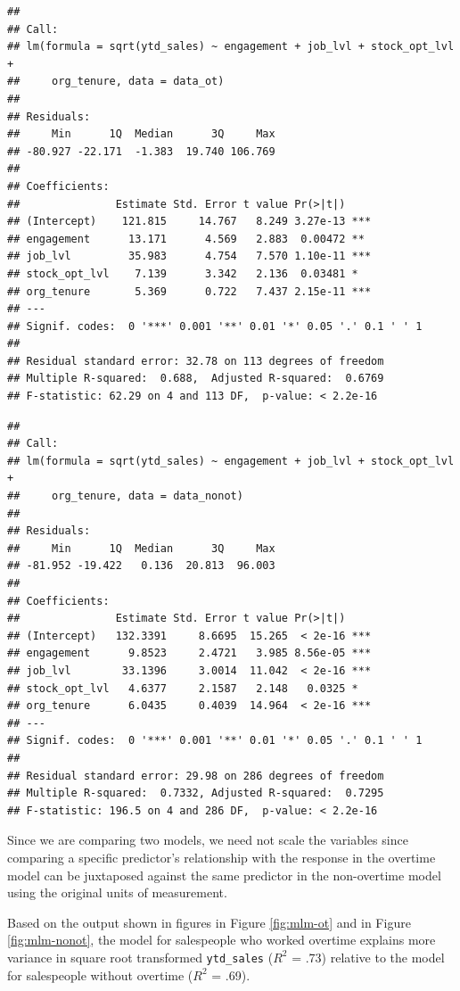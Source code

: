 \documentclass[
]{book}
\begin{document}
\begin{verbatim}
## 
## Call:
## lm(formula = sqrt(ytd_sales) ~ engagement + job_lvl + stock_opt_lvl + 
##     org_tenure, data = data_ot)
## 
## Residuals:
##     Min      1Q  Median      3Q     Max 
## -80.927 -22.171  -1.383  19.740 106.769 
## 
## Coefficients:
##               Estimate Std. Error t value Pr(>|t|)    
## (Intercept)    121.815     14.767   8.249 3.27e-13 ***
## engagement      13.171      4.569   2.883  0.00472 ** 
## job_lvl         35.983      4.754   7.570 1.10e-11 ***
## stock_opt_lvl    7.139      3.342   2.136  0.03481 *  
## org_tenure       5.369      0.722   7.437 2.15e-11 ***
## ---
## Signif. codes:  0 '***' 0.001 '**' 0.01 '*' 0.05 '.' 0.1 ' ' 1
## 
## Residual standard error: 32.78 on 113 degrees of freedom
## Multiple R-squared:  0.688,  Adjusted R-squared:  0.6769 
## F-statistic: 62.29 on 4 and 113 DF,  p-value: < 2.2e-16
\end{verbatim}

\begin{verbatim}
## 
## Call:
## lm(formula = sqrt(ytd_sales) ~ engagement + job_lvl + stock_opt_lvl + 
##     org_tenure, data = data_nonot)
## 
## Residuals:
##     Min      1Q  Median      3Q     Max 
## -81.952 -19.422   0.136  20.813  96.003 
## 
## Coefficients:
##               Estimate Std. Error t value Pr(>|t|)    
## (Intercept)   132.3391     8.6695  15.265  < 2e-16 ***
## engagement      9.8523     2.4721   3.985 8.56e-05 ***
## job_lvl        33.1396     3.0014  11.042  < 2e-16 ***
## stock_opt_lvl   4.6377     2.1587   2.148   0.0325 *  
## org_tenure      6.0435     0.4039  14.964  < 2e-16 ***
## ---
## Signif. codes:  0 '***' 0.001 '**' 0.01 '*' 0.05 '.' 0.1 ' ' 1
## 
## Residual standard error: 29.98 on 286 degrees of freedom
## Multiple R-squared:  0.7332, Adjusted R-squared:  0.7295 
## F-statistic: 196.5 on 4 and 286 DF,  p-value: < 2.2e-16
\end{verbatim}

Since we are comparing two models, we need not scale the variables since comparing a specific predictor's relationship with the response in the overtime model can be juxtaposed against the same predictor in the non-overtime model using the original units of measurement.

Based on the output shown in figures in Figure \ref{fig:mlm-ot} and in Figure \ref{fig:mlm-nonot}, the model for salespeople who worked overtime explains more variance in square root transformed \texttt{ytd\_sales} (\(R^2\) = .73) relative to the model for salespeople without overtime (\(R^2\) = .69).
\end{document}
